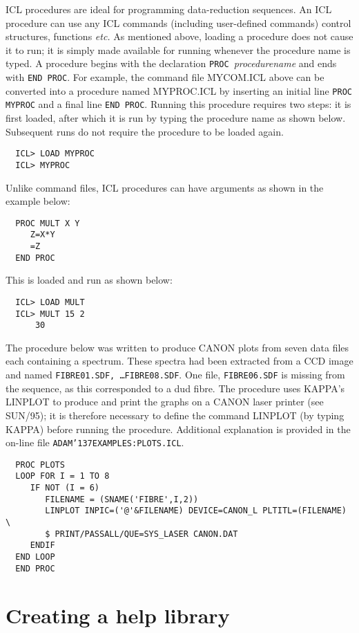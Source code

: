 \documentclass[twoside,11pt]{article}
\renewcommand{\_}{{\tt\char'137}}
\newcommand{\xref}[3]{#1}
\newcommand{\xlabel}[1]{}
\begin{document}
ICL procedures are ideal for programming data-reduction sequences.
An ICL procedure can use any ICL commands (including user-defined commands)
control structures, functions {\it etc.}
As mentioned above, loading a procedure does not
cause it to run; it is simply made available for running whenever the
procedure name is typed.
A procedure begins with the declaration {\tt PROC}~{\sl procedurename}
and ends with {\tt END PROC}.
For example, the command file MYCOM.ICL above can be converted into a
procedure named MYPROC.ICL by inserting an initial line
\verb+PROC MYPROC+ and a final line \verb+END PROC+.
Running this procedure requires two steps: it is  first loaded, after which
it is
run by typing the procedure name
as shown below.
Subsequent runs do not require the procedure to be loaded again.
\begin{verbatim}
  ICL> LOAD MYPROC
  ICL> MYPROC
\end{verbatim}
Unlike command files, ICL procedures can have arguments as shown in the
example below:
\begin{verbatim}
  PROC MULT X Y
     Z=X*Y
     =Z
  END PROC
\end{verbatim}
This is loaded and run as shown below:
\begin{verbatim}
  ICL> LOAD MULT
  ICL> MULT 15 2
      30
\end{verbatim}
The procedure below was written to produce CANON plots from seven
data files each containing a spectrum.
These spectra had been extracted from a CCD image and named
{\tt FIBRE01.SDF,  \ldots FIBRE08.SDF}. One file,
{\tt FIBRE06.SDF}  is missing from the sequence, as this corresponded to
a dud fibre.
The procedure uses KAPPA's LINPLOT to produce and print
the graphs on a CANON laser printer (see \xref{SUN/95}{sun95}{}); it is
therefore necessary to define the command LINPLOT
(by typing KAPPA) before running the procedure. Additional explanation is
provided in the on-line file {\tt ADAM\_EXAMPLES:PLOTS.ICL}.
\begin{verbatim}
  PROC PLOTS
  LOOP FOR I = 1 TO 8
     IF NOT (I = 6)
        FILENAME = (SNAME('FIBRE',I,2))
        LINPLOT INPIC=('@'&FILENAME) DEVICE=CANON_L PLTITL=(FILENAME) \
        $ PRINT/PASSALL/QUE=SYS_LASER CANON.DAT
     ENDIF
  END LOOP
  END PROC
\end{verbatim}

\newpage
\section{Creating a help library\label{help}\xlabel{creating_a_help_library}}
\end{document}

